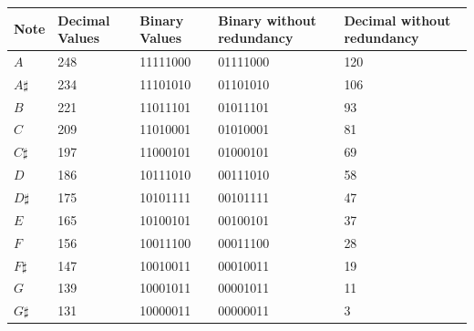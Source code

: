 \begin{tabularx}{\textwidth}{YYYYY}
	\toprule
	Note      & Decimal Values & Binary Values         & Binary without redundancy & Decimal without redundancy \\ \midrule
	$A$       & 248            & {\color{red}1}1111000 & {\color{gray}0}1111000    & 120                        \\
	$A\sharp$ & 234            & {\color{red}1}1101010 & {\color{gray}0}1101010    & 106                        \\
	$B$       & 221            & {\color{red}1}1011101 & {\color{gray}0}1011101    & 93                         \\
	$C$       & 209            & {\color{red}1}1010001 & {\color{gray}0}1010001    & 81                         \\
	$C\sharp$ & 197            & {\color{red}1}1000101 & {\color{gray}0}1000101    & 69                         \\
	$D$       & 186            & {\color{red}1}0111010 & {\color{gray}0}0111010    & 58                         \\
	$D\sharp$ & 175            & {\color{red}1}0101111 & {\color{gray}0}0101111    & 47                         \\
	$E$       & 165            & {\color{red}1}0100101 & {\color{gray}0}0100101    & 37                         \\
	$F$       & 156            & {\color{red}1}0011100 & {\color{gray}0}0011100    & 28                         \\
	$F\sharp$ & 147            & {\color{red}1}0010011 & {\color{gray}0}0010011    & 19                         \\
	$G$       & 139            & {\color{red}1}0001011 & {\color{gray}0}0001011    & 11                         \\
	$G\sharp$ & 131            & {\color{red}1}0000011 & {\color{gray}0}0000011    & 3                          \\ \bottomrule
\end{tabularx}
